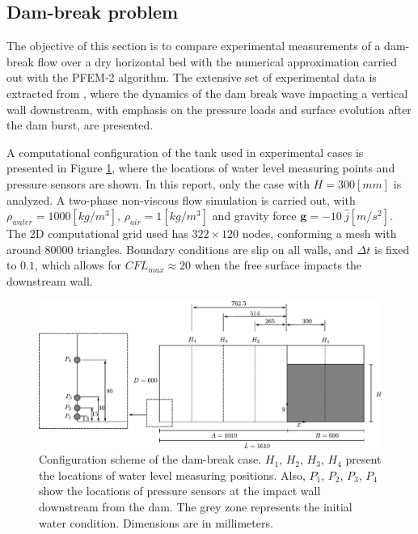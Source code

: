 \subsection{Dam-break problem}%

The objective of this section is to compare experimental measurements of a dam-break flow over a dry horizontal bed with the numerical approximation carried out with the PFEM-2 algorithm. The extensive set of experimental data is extracted from \cite{Lobovsky13}, where the dynamics of the dam break wave impacting a vertical wall downstream, with emphasis on the pressure loads and surface evolution after the dam burst, are presented.

A computational configuration of the tank used in experimental cases is presented in Figure \ref{fg:dambreak-config}, where the locations of water level measuring points and pressure sensors are shown. In this report, only the case with $H=300[mm]$ is analyzed. A two-phase non-viscous flow simulation is carried out, with $\rho_{water}=1000[kg/m^3]$, $\rho_{air}=1[kg/m^3]$ and gravity force $\mathbf{g}=-10\ \hat{j} [m/s^2]$. The 2D computational grid used has $322\times120$ nodes, conforming a mesh with around $80000$ triangles. Boundary conditions are slip on all walls, and $\Delta t$ is fixed to $0.1$, which allows for $CFL_{max}\approx20$ when the free surface impacts the downstream wall.

\begin{figure}[htbp]
  \begin{center}
      \includegraphics[width=\columnwidth]{images/dam_break_config.pdf}
  \end{center}
  \caption{\label{fg:dambreak-config} Configuration scheme of the dam-break case. $H_1$, $H_2$, $H_3$, $H_4$ present the locations of water level measuring positions. Also, $P_1$, $P_2$, $P_3$, $P_4$ show the locations of pressure sensors at the impact wall downstream from the dam. The grey zone represents the initial water condition. Dimensions are in millimeters.}
\end{figure}

